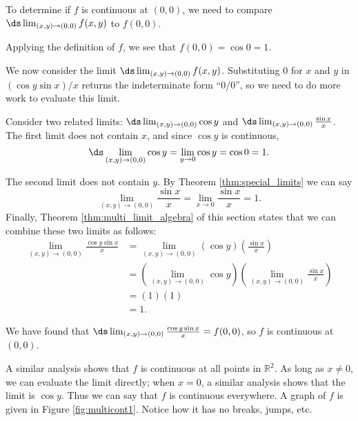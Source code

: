 {To determine if $f$ is continuous at $(0,0)$, we need to compare $\ds\lim_{(x,y)\to (0,0)} f(x,y)$ to $f(0,0)$. 

Applying the definition of $f$, we see that $f(0,0) = \cos 0 = 1$. 

We now consider the limit $\ds \lim_{(x,y)\to (0,0)} f(x,y)$. Substituting $0$ for $x$ and $y$ in $(\cos y\sin x)/x$ returns the indeterminate form ``0/0'', so we need to do more work to evaluate this limit.

Consider two related limits: $\ds \lim_{(x,y)\to (0,0)} \cos y$ and $\ds \lim_{(x,y)\to(0,0)} \frac{\sin x}x$. The first limit does not contain $x$, and since $\cos y$ is continuous, $$\ds \lim_{(x,y)\to (0,0)} \cos y =\lim_{y\to 0} \cos y = \cos 0 = 1.$$

The second limit does not contain $y$. By Theorem \ref{thm:special_limits} we can say
$$\lim_{(x,y)\to (0,0)} \frac{\sin x}{x} = \lim_{x\to 0} \frac{\sin x}{x} = 1.$$
Finally, Theorem \ref{thm:multi_limit_algebra} of this section states that we can combine these two limits as follows:
\begin{align*}
\lim_{(x,y)\to (0,0)} \frac{\cos y\sin x}{x} &= \lim_{(x,y)\to (0,0)} (\cos y)\left(\frac{\sin x}{x}\right) \\ 
&=\left(\lim_{(x,y)\to (0,0)} \cos y\right)\left(\lim_{(x,y)\to (0,0)} \frac{\sin x}{x}\right) \\
  &= (1)(1)\\
	&=1.
\end{align*}

We have found that $\ds \lim_{(x,y)\to (0,0)} \frac{\cos y\sin x}{x} = f(0,0)$, so $f$ is continuous at $(0,0)$.

A similar analysis shows that $f$ is continuous at all points in $\mathbb{R}^2$. As long as $x\neq0$, we can evaluate the limit directly; when $x=0$, a similar analysis shows that the limit is $\cos y$. Thus we can say that $f$ is continuous everywhere. A graph of $f$ is given in Figure \ref{fig:multicont1}. Notice how it has no breaks, jumps, etc.
}\\


